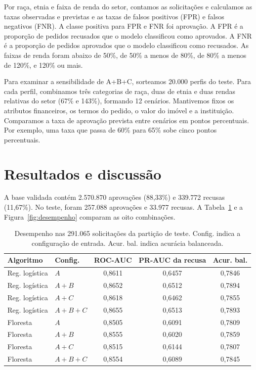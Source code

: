 \documentclass[12pt]{article}
\begin{document}
Por raça, etnia e faixa de renda do setor, contamos as solicitações
e calculamos as taxas observadas e previstas e as taxas de falsos
positivos (FPR) e falsos negativos (FNR). A classe positiva para FPR
e FNR foi aprovação. A FPR é a proporção de pedidos recusados que o
modelo classificou como aprovados. A FNR é a proporção de pedidos
aprovados que o modelo classificou como recusados. As faixas de renda foram abaixo de 50\%,
de 50\% a menos de 80\%, de 80\% a menos de 120\%, e 120\% ou mais.

Para examinar a sensibilidade de A+B+C, sorteamos 20.000 perfis do
teste. Para cada perfil, combinamos três categorias de raça, duas
de etnia e duas rendas relativas do setor (67\% e 143\%), formando
12 cenários. Mantivemos fixos os atributos financeiros, os termos
do pedido, o valor do imóvel e a instituição. Comparamos a taxa de
aprovação prevista entre cenários em pontos percentuais. Por
exemplo, uma taxa que passa de 60\% para 65\% sobe cinco pontos
percentuais.

\section{Resultados e discussão}

A base validada contém 2.570.870 aprovações (88,33\%) e 339.772
recusas (11,67\%). No teste, foram 257.088 aprovações e 33.977
recusas. A Tabela~\ref{tab:resultados-integral} e a
Figura~\ref{fig:desempenho} comparam as oito combinações.

\begin{table}[htbp]
\centering
\caption{Desempenho nas 291.065 solicitações da partição de teste. Config. indica a configuração de entrada. Acur. bal. indica acurácia balanceada.}
\label{tab:resultados-integral}
\small
\begin{tabular}{@{}llccc@{}}
\hline
Algoritmo & Config. & ROC-AUC & PR-AUC da recusa & Acur. bal. \\
\hline
Reg. logística & $A$ & 0,8611 & 0,6457 & 0,7846 \\
Reg. logística & $A+B$ & 0,8652 & 0,6512 & 0,7894 \\
Reg. logística & $A+C$ & 0,8618 & 0,6462 & 0,7855 \\
Reg. logística & $A+B+C$ & 0,8655 & 0,6513 & 0,7893 \\
Floresta & $A$ & 0,8505 & 0,6091 & 0,7809 \\
Floresta & $A+B$ & 0,8555 & 0,6020 & 0,7859 \\
Floresta & $A+C$ & 0,8515 & 0,6144 & 0,7807 \\
Floresta & $A+B+C$ & 0,8554 & 0,6089 & 0,7845 \\
\hline
\end{tabular}
\end{table}
\end{document}
